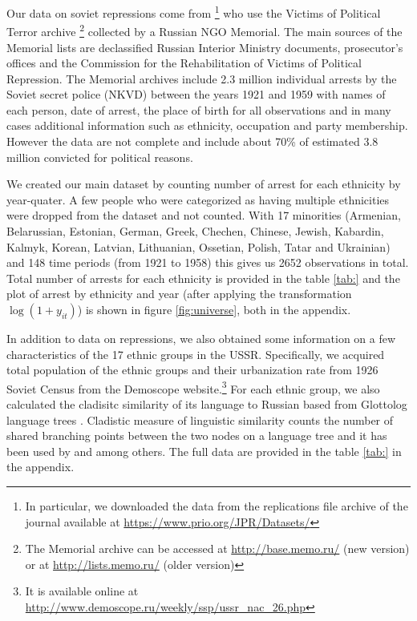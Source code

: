 Our data on soviet repressions come from  \citet{zhukov_stalins_2018}\footnote{In particular, we downloaded the data from the replications file archive of the journal available  at \url{https://www.prio.org/JPR/Datasets/}} who use  the Victims of Political Terror archive \footnote{The Memorial archive can be accessed at \url{http://base.memo.ru/} (new version) or at \url{http://lists.memo.ru/} (older version)} collected by a Russian NGO Memorial. The main sources of the Memorial lists are declassified Russian Interior Ministry documents, prosecutor’s offices and the Commission for the Rehabilitation of Victims of Political Repression.
 The Memorial archives include 2.3 million individual arrests by the Soviet secret police (NKVD) between  the years 1921 and 1959 with names of each person, date of arrest, the place of birth for all observations and  in many cases additional information such as ethnicity, occupation and party membership. 
 However the data are not complete and include about 70\% of estimated 3.8 million convicted for political reasons.


We created our main dataset by counting number of arrest for each ethnicity by year-quater.  A few people who were categorized as having multiple ethnicities were dropped from the dataset and not counted. 
With 17  minorities (Armenian, Belarussian, Estonian, German, Greek, Chechen, Chinese, Jewish, Kabardin, Kalmyk, Korean, Latvian, Lithuanian, Ossetian, Polish, Tatar and Ukrainian) and 148 time periods (from 1921 to 1958) this gives us 2652 observations in total. Total number of arrests for each ethnicity is provided in the table \ref{tab:} and the plot of arrest by ethnicity and year (after applying the transformation $\log\left(1 + y_{it}\right)$) is shown in figure \ref{fig:universe}, both in the appendix. 

In addition to data on repressions, we also obtained some information on a few characteristics of the 17 ethnic groups in the USSR. 
Specifically, we acquired total population of the ethnic groups and their urbanization rate from 1926 Soviet Census from the Demoscope website.\footnote{It is available online at \url{http://www.demoscope.ru/weekly/ssp/ussr_nac_26.php}} For each ethnic group, we also calculated the cladisitc similarity of its language to Russian based from Glottolog language trees \citep{hammarstrom_glottolog_2018}.
Cladistic measure of linguistic similarity counts the number of shared branching points between the two nodes on a language tree and it has been used by \citet{fearon_ethnic_2003} and \citet{dickens_ethnolinguistic_2018} among others. 
The full data are provided in the table \ref{tab:} in the appendix. 
